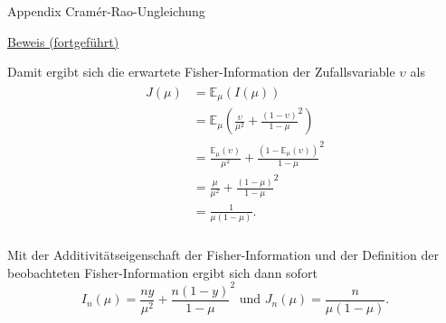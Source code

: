 \documentclass[
  8pt,
  ignorenonframetext,
]{beamer}
\newcommand{\ups} {\upsilon}
\begin{document}
\begin{frame}{Appendix \textbar{} Cramér-Rao-Ungleichung}
\protect\hypertarget{appendix-cramuxe9r-rao-ungleichung-10}{}
\footnotesize

\underline{Beweis (fortgeführt)}

Damit ergibt sich die erwartete Fisher-Information der Zufallsvariable
\(\ups\) als \begin{align}
\begin{split}
J(\mu)
& = \mathbb{E}_\mu(I(\mu))                                                                  \\
& = \mathbb{E}_\mu \left(\frac{\ups}{\mu^2} + \frac{(1 - \ups)}{1-\mu}^{2} \right)              \\
& = \frac{\mathbb{E}_\mu(\ups)}{\mu^2} + \frac{(1 - \mathbb{E}_\mu(\ups))}{1-\mu}^{2}           \\
& = \frac{\mu}{\mu^2} + \frac{(1 - \mu)}{1-\mu}^{2}                                         \\
& = \frac{1}{\mu(1-\mu)}.                                                                   \\
\end{split}
\end{align}

Mit der Additivitätseigenschaft der Fisher-Information und der
Definition der beobachteten Fisher-Information ergibt sich dann sofort
\begin{equation}
I_n(\mu)
=  \frac{ny}{\mu^2} + \frac{n(1 - y)}{1-\mu}^{2}
\mbox{ und }
J_n(\mu) = \frac{n}{\mu(1-\mu)}.
\end{equation}
\end{frame}
\end{document}
